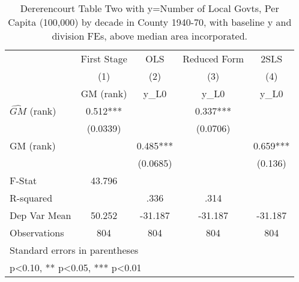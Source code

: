 \begin{table}[htbp]\centering
\def\sym#1{\ifmmode^{#1}\else\(^{#1}\)\fi}
\caption{Dererencourt Table Two with y=Number of Local Govts, Per Capita (100,000) by decade in County 1940-70, with baseline y and division FEs, above median area incorporated.}
\begin{tabular}{l*{4}{c}}
\toprule
                    & First Stage   &         OLS   &Reduced Form   &        2SLS   \\
                    &\multicolumn{1}{c}{(1)}&\multicolumn{1}{c}{(2)}&\multicolumn{1}{c}{(3)}&\multicolumn{1}{c}{(4)}\\
                    &\multicolumn{1}{c}{GM  (rank)}&\multicolumn{1}{c}{y\_L0}&\multicolumn{1}{c}{y\_L0}&\multicolumn{1}{c}{y\_L0}\\
\midrule
$\hat{GM}$ (rank)   &       0.512***&               &       0.337***&               \\
                    &    (0.0339)   &               &    (0.0706)   &               \\
\addlinespace
GM  (rank)          &               &       0.485***&               &       0.659***\\
                    &               &    (0.0685)   &               &     (0.136)   \\
\midrule
F-Stat              &      43.796   &               &               &               \\
R-squared           &               &        .336   &        .314   &               \\
Dep Var Mean        &      50.252   &     -31.187   &     -31.187   &     -31.187   \\
Observations        &         804   &         804   &         804   &         804   \\
\bottomrule
\multicolumn{5}{l}{\footnotesize Standard errors in parentheses}\\
\multicolumn{5}{l}{\footnotesize * p<0.10, ** p<0.05, *** p<0.01}\\
\end{tabular}
\end{table}
